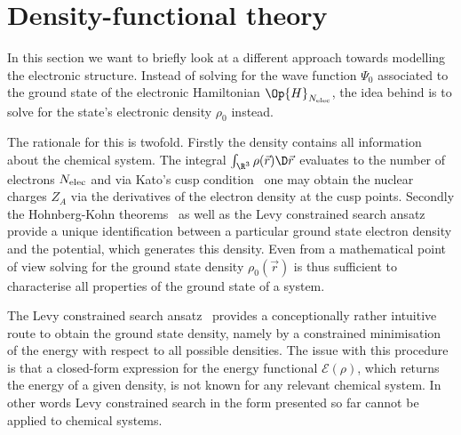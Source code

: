 \section{Density-functional theory}
\label{sec:DFT}
In this section we want to briefly look at a different
approach towards modelling the electronic structure.
Instead of solving for the wave function $\Psi_0$ associated to the
ground state of the electronic Hamiltonian $\Op{H}_{\Nelec}$,
the idea behind 
is to solve for the state's electronic density $\rho_0$ instead.

The rationale for this is twofold.
Firstly the density contains all information about the chemical system.
The integral
$\int_{\R^3} \rho(\vec{r}) \D\vec{r}$
evaluates to the number of electrons $N_\text{elec}$
and via Kato's cusp condition~\cite{Kato1951} one may obtain the nuclear
charges $Z_A$ via the derivatives of the electron density at the cusp points.
Secondly the Hohnberg-Kohn theorems~\cite{Hohenberg1964}
as well as the Levy constrained search ansatz~\cite{Levy1979}
provide a unique identification between a particular ground state electron density
and the potential, which generates this density.
Even from a mathematical point of view
solving for the ground state density $\rho_0(\vec{r})$ is thus
sufficient to characterise all properties of the ground state of a system.

The Levy constrained search ansatz~\cite{Levy1979}
provides a conceptionally rather
intuitive route to obtain the ground state density,
namely by a constrained minimisation of the energy
with respect to all possible densities.
The issue with this procedure is that a closed-form expression
for the energy functional $\mathcal{E}(\rho)$,
which returns the energy of a given density,
is not known for any relevant chemical system.
In other words Levy constrained search in the form presented so far
cannot be applied to chemical systems.

